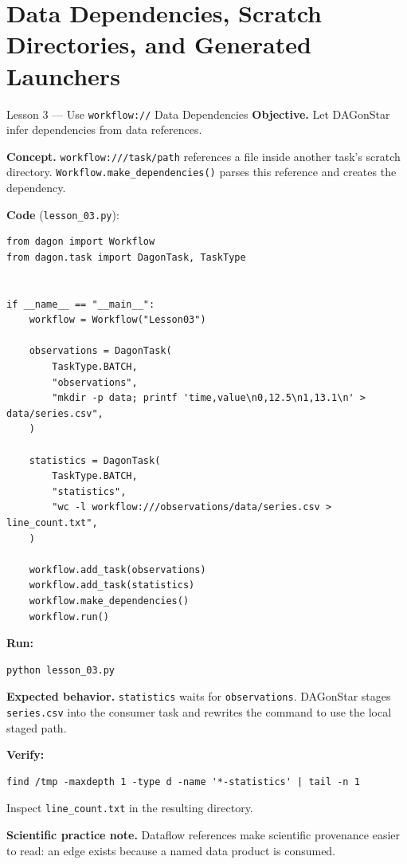\chapter{Data Dependencies, Scratch Directories, and Generated Launchers}
\label{ch:lessons-03-04}

\begin{lessonbox}{Lesson 3 --- Use \texttt{workflow://} Data Dependencies}
\textbf{Objective.} Let DAGonStar infer dependencies from data references.

\textbf{Concept.} \texttt{workflow:///task/path} references a file inside
another task's scratch directory. \texttt{Workflow.make\_dependencies()}
parses this reference and creates the dependency.

\textbf{Code} (\texttt{lesson\_03.py}):
\begin{lstlisting}
from dagon import Workflow
from dagon.task import DagonTask, TaskType


if __name__ == "__main__":
    workflow = Workflow("Lesson03")

    observations = DagonTask(
        TaskType.BATCH,
        "observations",
        "mkdir -p data; printf 'time,value\n0,12.5\n1,13.1\n' > data/series.csv",
    )

    statistics = DagonTask(
        TaskType.BATCH,
        "statistics",
        "wc -l workflow:///observations/data/series.csv > line_count.txt",
    )

    workflow.add_task(observations)
    workflow.add_task(statistics)
    workflow.make_dependencies()
    workflow.run()
\end{lstlisting}

\textbf{Run:}
\begin{lstlisting}[style=bash]
python lesson_03.py
\end{lstlisting}

\textbf{Expected behavior.} \texttt{statistics} waits for
\texttt{observations}. DAGonStar stages \texttt{series.csv} into the consumer
task and rewrites the command to use the local staged path.

\textbf{Verify:}
\begin{lstlisting}[style=bash]
find /tmp -maxdepth 1 -type d -name '*-statistics' | tail -n 1
\end{lstlisting}
Inspect \texttt{line\_count.txt} in the resulting directory.

\textbf{Scientific practice note.} Dataflow references make scientific
provenance easier to read: an edge exists because a named data product is
consumed.
\end{lessonbox}

